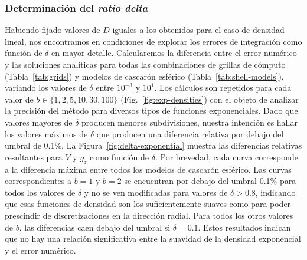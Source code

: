 \subsubsection{Determinación del \emph{ratio delta}}

Habiendo fijado valores de $D$ iguales a los obtenidos para el caso de
densidad lineal, nos encontramos en condiciones de explorar los errores de
integración como función de $\delta$ en mayor detalle.
Calcularemos la diferencia entre el error numérico y las soluciones analíticas
para todas las combinaciones de grillas de cómputo (Tabla~\ref{tab:grids})
y modelos de cascarón esférico (Tabla~\ref{tab:shell-models}),
variando los valores de $\delta$ entre $10^{-3}$ y $10^{1}$.
Los cálculos son repetidos para cada valor de $b \in \{1, 2, 5, 10, 30, 100\}$
(Fig.~\ref{fig:exp-densities}) con el objeto de analizar la precisión del
método para diversos tipos de funciones exponenciales.
Dado que valores mayores de $\delta$ producen menores subdivisiones, nuestra
intención es hallar los valores máximos de $\delta$ que producen una diferencia
relativa por debajo del umbral de 0.1\%.
La Figura~\ref{fig:delta-exponential} muestra las diferencias relativas
resultantes para $V$ y $g_z$ como función de $\delta$.
Por brevedad, cada curva corresponde a la diferencia máxima entre todos los
modelos de cascarón esférico.
Las curvas correspondientes a $b=1$ y $b=2$ se encuentran por debajo del umbral
0.1\% para todos los valores de $\delta$ y no se ven modificadas para valores
de $\delta > 0.8$, indicando que esas funciones de densidad son los
suficientemente suaves como para poder prescindir de discretizaciones en la
dirección radial.
Para todos los otros valores de $b$, las diferencias caen debajo del umbral si
$\delta=0.1$.
Estos resultados indican que no hay una relación significativa entre la
suavidad de la densidad exponencial y el error numérico.

